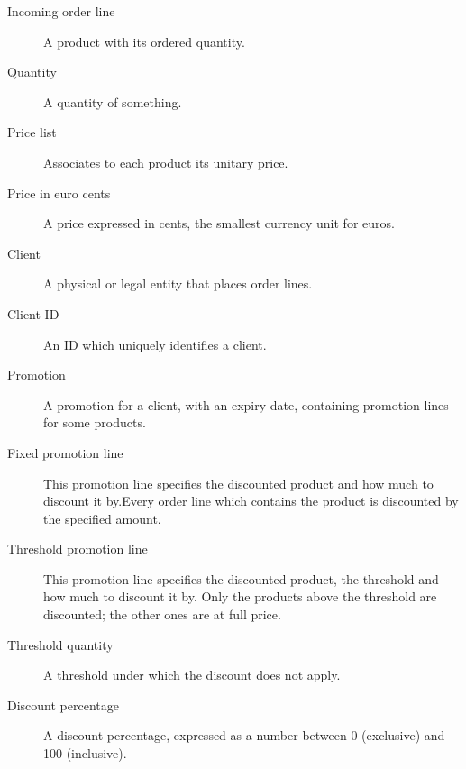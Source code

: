 \begin{description}
    \item[Incoming order line] A product with its ordered quantity.
    \item[Quantity] A quantity of something.
    \item[Price list] Associates to each product its unitary price.
    \item[Price in euro cents] A price expressed in cents, the smallest currency unit for euros.
    \item[Client] A physical or legal entity that places order lines.
    \item[Client ID] An ID which uniquely identifies a client.
    \item[Promotion] A promotion for a client, with an expiry date, containing promotion lines for some products.
    \item[Fixed promotion line]	This promotion line specifies the discounted product and how much to discount it by.Every order line which contains the product is discounted by the specified amount.
    \item[Threshold promotion line] This promotion line specifies the discounted product, the threshold and how much to discount it by. Only the products above the threshold are discounted; the other ones are at full price.
    \item[Threshold quantity] A threshold under which the discount does not apply.
    \item[Discount percentage] A discount percentage, expressed as a number between 0 (exclusive) and 100 (inclusive).
\end{description}